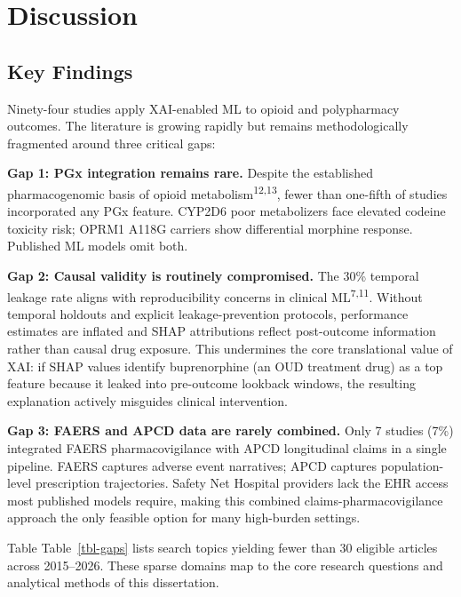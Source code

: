 \documentclass[
  12pt,
]{book}
\begin{document}
\chapter{Discussion}\label{sec-discussion}

\section{Key Findings}\label{key-findings}

Ninety-four studies apply XAI-enabled ML to opioid and polypharmacy
outcomes. The literature is growing rapidly but remains methodologically
fragmented around three critical gaps:

\textbf{Gap 1: PGx integration remains rare.} Despite the established
pharmacogenomic basis of opioid metabolism\textsuperscript{12,13}, fewer
than one-fifth of studies incorporated any PGx feature. CYP2D6 poor
metabolizers face elevated codeine toxicity risk; OPRM1 A118G carriers
show differential morphine response. Published ML models omit both.

\textbf{Gap 2: Causal validity is routinely compromised.} The 30\%
temporal leakage rate aligns with reproducibility concerns in clinical
ML\textsuperscript{7,11}. Without temporal holdouts and explicit
leakage-prevention protocols, performance estimates are inflated and
SHAP attributions reflect post-outcome information rather than causal
drug exposure. This undermines the core translational value of XAI: if
SHAP values identify buprenorphine (an OUD treatment drug) as a top
feature because it leaked into pre-outcome lookback windows, the
resulting explanation actively misguides clinical intervention.

\textbf{Gap 3: FAERS and APCD data are rarely combined.} Only 7 studies
(7\%) integrated FAERS pharmacovigilance with APCD longitudinal claims
in a single pipeline. FAERS captures adverse event narratives; APCD
captures population-level prescription trajectories. Safety Net Hospital
providers lack the EHR access most published models require, making this
combined claims-pharmacovigilance approach the only feasible option for
many high-burden settings.

Table Table~\ref{tbl-gaps} lists search topics yielding fewer than 30
eligible articles across 2015--2026. These sparse domains map to the
core research questions and analytical methods of this dissertation.
\end{document}
